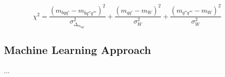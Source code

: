 \begin{equation}
	\chi^{2} = \frac{(m_{bqq'} - m_{\bar{b}q''q'''})^{2}}{\sigma^{2}_{\Delta_{m_{bqq'}}}}  + \frac{(m_{qq'} - m_{W})^{2}}{\sigma^{2}_{W}} + \frac{(m _{q''q'''} - m_{W})^{2}}{\sigma^{2}_{W}}
\end{equation} 

\subsection{Machine Learning Approach}\label{subsec:ML approach}


...











